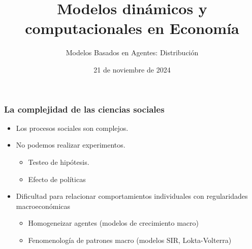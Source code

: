 \documentclass[11pt]{beamer}
\begin{document}
	\title{Modelos dinámicos y computacionales en Economía}
	\subtitle{Modelos Basados en Agentes: Distribución}
	\date{21 de noviembre de 2024}



\begin{frame}
\frametitle{La complejidad de las ciencias sociales}
\begin{itemize}
	\item Los procesos sociales son complejos.
	\item No podemos realizar experimentos.
    \begin{itemize}
        \item Testeo de hipótesis.
	\item Efecto de políticas
    \end{itemize}
	\item Dificultad para relacionar comportamientos individuales con regularidades macroeconómicas
    \begin{itemize}
        \item Homogeneizar agentes (modelos de crecimiento macro)
	\item Fenomenología de patrones macro (modelos SIR, Lokta-Volterra)
    \end{itemize}
\end{itemize}
\end{frame}
\end{document}
